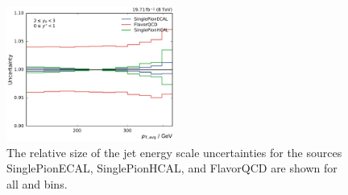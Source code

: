\begin{figure}[htbp]
    \includegraphics[width=0.49\textwidth]{figures/measurement/jec_relunc_1_yb2ys0.pdf}
    \caption[Split-up of JEC sources: Part II] {The relative size of the jet energy scale
             uncertainties for the sources SinglePionECAL, SinglePionHCAL, and
             FlavorQCD are shown for all \ystar and \yboost bins.}
    \label{fig:jec_relunc_1}
\end{figure}

